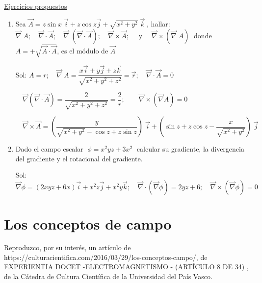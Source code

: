 \underline{Ejercicios propuestos}

\begin{enumerate}
\item Sea $\overrightarrow A = z \sin x \; \vec i + z \cos z \vec j + \sqrt{x^2+y^2}\; \vec k\; $, hallar:  	$\overrightarrow \nabla \; A; \quad   \overrightarrow {\nabla} \cdot \overrightarrow A; \quad \overrightarrow \nabla \; (\overrightarrow {\nabla} \cdot \overrightarrow A); \quad \overrightarrow {\nabla} \times \overrightarrow A; \quad \text { y } \quad \overrightarrow {\nabla} \times ( \overrightarrow \nabla \; A )\; $  donde $A =+\sqrt{\overrightarrow A \cdot \overrightarrow A}$, es el módulo de $\overrightarrow A$

\vspace{3mm} \textcolor{gris}{Sol: $A=r; \quad \overrightarrow \nabla \; A =\dfrac {x\vec i + y \vec j + z \vec k}{\sqrt{x^2+y^2+z^2}}=\vec r; \quad \overrightarrow \nabla \cdot \overrightarrow A= 0 $}

\textcolor{gris}{$\quad \overrightarrow \nabla (\overrightarrow \nabla \cdot \overrightarrow A)=\dfrac {2}{\sqrt{x^2+y^2+z^2}}=\dfrac 2 r ;\qquad \overrightarrow \nabla \times (\overrightarrow \nabla A ) =0$}


\textcolor{gris}{$ \quad \overrightarrow \nabla \times \overrightarrow A= \left( \dfrac {y}{\sqrt{x^2+y^2}-\cos z + z \sin z} \right)\; \vec i + \left (\sin z + z \cos z - \dfrac {x}{\sqrt{x^2+y^2}}  \right)\; \vec j$}

\item Dado el campo escalar $\; \phi=x^2yz+3x^2\; $ calcular su gradiente, la divergencia del gradiente y el rotacional del gradiente.

\vspace{3mm} \textcolor{gris}{Sol: $\overrightarrow \nabla \phi= (2xyz+6x)\vec i+x^2z\vec j+x^2y\vec k; \quad \overrightarrow \nabla \cdot(\overrightarrow \nabla \phi) = 2yz+6 ; \quad \overrightarrow \nabla \times (\overrightarrow \nabla \phi) =0$}
\end{enumerate}

\section{Los conceptos de campo}

\textcolor{gris}{ Reproduzco, por su interés, un artículo de https://culturacientifica.com/2016/03/29/los-conceptos-campo/, de EXPERIENTIA DOCET -ELECTROMAGNETISMO - (ARTÍCULO 8 DE 34) , de la Cátedra de Cultura Científica de la Universidad del País Vasco.}

